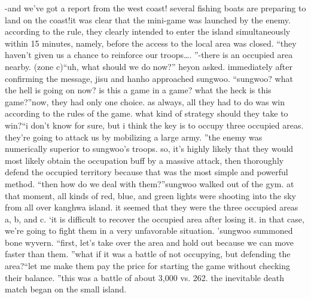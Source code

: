-and we’ve got a report from the west coast! several fishing boats are preparing to land on the coast!it was clear that the mini-game was launched by the enemy.
 according to the rule, they clearly intended to enter the island simultaneously within 15 minutes, namely, before the access to the local area was closed.
“they haven’t given us a chance to reinforce our troops….
”-there is an occupied area nearby.
 (zone c)“uh, what should we do now?” heyon asked.
immediately after confirming the message, jisu and hanho approached sungwoo.
“sungwoo? what the hell is going on now? is this a game in a game? what the heck is this game?”now, they had only one choice.
 as always, all they had to do was win according to the rules of the game.
 what kind of strategy should they take to win?“i don’t know for sure, but i think the key is to occupy three occupied areas.
 they’re going to attack us by mobilizing a large army.
”the enemy was numerically superior to sungwoo’s troops.
 so, it’s highly likely that they would most likely obtain the occupation buff by a massive attack, then thoroughly defend the occupied territory because that was the most simple and powerful method.
“then how do we deal with them?”sungwoo walked out of the gym.
 at that moment, all kinds of red, blue, and green lights were shooting into the sky from all over kanghwa island.
 it seemed that they were the three occupied areas a, b, and c.
‘it is difficult to recover the occupied area after losing it.
 in that case, we’re going to fight them in a very unfavorable situation.
’sungwoo summoned bone wyvern.
“first, let’s take over the area and hold out because we can move faster than them.
”what if it was a battle of not occupying, but defending the area?“let me make them pay the price for starting the game without checking their balance.
”this was a battle of about 3,000 vs.
 262.
 the inevitable death match began on the small island.


 